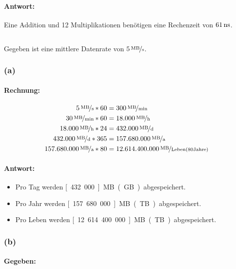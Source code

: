 \documentclass[11pt,a4paper]{article}
\begin{document}
\paragraph{Antwort:}
Eine Addition und 12 Multiplikationen benötigen eine Rechenzeit von $\unit[61]{ns}$.

\subsection{} %
Gegeben ist eine mittlere Datenrate von $\unitfrac[5]{MB}{s}$.


\subsubsection{(a)} %
\paragraph{Rechnung:}

\begin{align}
\unitfrac[5]{MB}{s}*60 &= \unitfrac[300]{MB}{min}\\
\unitfrac[30]{MB}{min}*60 &= \unitfrac[18.000]{MB}{h}\\
\unitfrac[18.000]{MB}{h}*24 &=  \unitfrac[432.000]{MB}{d}\\
\unitfrac[432.000]{MB}{d}*365 &= \unitfrac[157.680.000]{MB}{a}\\
\unitfrac[157.680.000]{MB}{a}*80 &= \unitfrac[12.614.400.000]{MB}{Leben(80 Jahre)}
\end{align}

\paragraph{Antwort:}
\begin{itemize}
  \item Pro Tag werden \unit[432.000]{MB} (\unit[430]{GB}) abgespeichert.
  \item Pro Jahr werden \unit[157.680.000]{MB} (\unit[157,68]{TB}) abgespeichert.
  \item Pro Leben werden \unit[12.614.400.000]{MB} (\unit[12614,4]{TB}) abgespeichert.
\end{itemize}


\subsubsection{(b)} %
\paragraph{Gegeben:}
\end{document}
